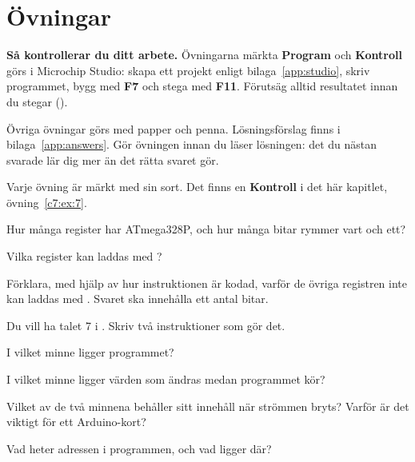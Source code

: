 %

\section{Övningar}
\label{c7:sec:exercises}\label{c7:app:d}

\begin{aside}
\textbf{Så kontrollerar du ditt arbete.} Övningarna märkta \textbf{Program} och \textbf{Kontroll}
görs i Microchip Studio: skapa ett projekt enligt bilaga~\ref{app:studio}, skriv programmet, bygg
med \textbf{F7} och stega med \textbf{F11}. Förutsäg alltid resultatet innan du stegar
().

Övriga övningar görs med papper och penna. Lösningsförslag finns i bilaga~\ref{app:answers}. Gör
övningen innan du läser lösningen: det du nästan svarade lär dig mer än det rätta svaret gör.
\end{aside}

Varje övning är märkt med sin sort. Det finns en \textbf{Kontroll} i det här kapitlet,
övning~\ref{c7:ex:7}.

\label{c7:ex:1}
\begin{parts}
  \item Hur många register har ATmega328P, och hur många bitar rymmer vart och ett?
  \item Vilka register kan laddas med ?
  \item Förklara, med hjälp av hur instruktionen  är kodad, varför de övriga registren
    inte kan laddas med . Svaret ska innehålla ett antal bitar.
  \item Du vill ha talet 7 i . Skriv två instruktioner som gör det.
\end{parts}

\label{c7:ex:2}
\begin{parts}
  \item I vilket minne ligger programmet?
  \item I vilket minne ligger värden som ändras medan programmet kör?
  \item Vilket av de två minnena behåller sitt innehåll när strömmen bryts? Varför är det viktigt
    för ett Arduino-kort?
  \item Vad heter adressen  i programmen, och vad ligger där?
\end{parts}

